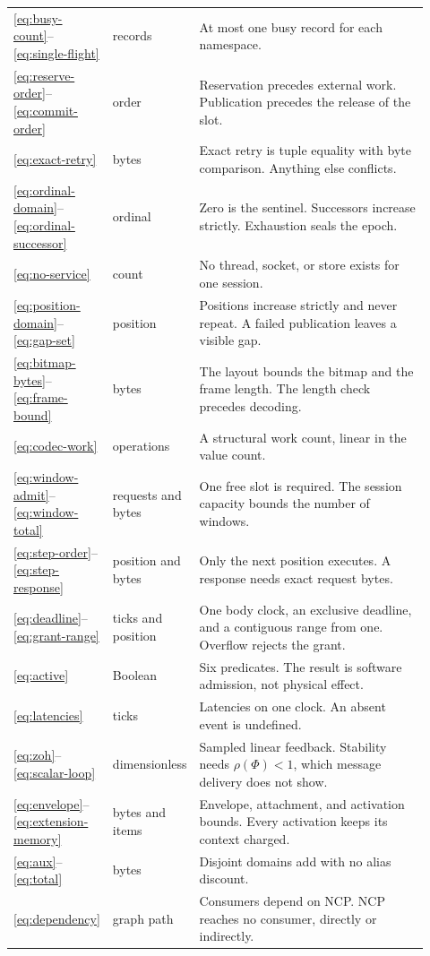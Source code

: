 \documentclass[11pt,a4paper]{article}
\theoremstyle{definition}
\begin{document}
\begin{longtable}{L{0.12\linewidth}L{0.17\linewidth}L{0.63\linewidth}}
\eqref{eq:busy-count}--\eqref{eq:single-flight} & records & At most one busy record for each namespace. \\
\eqref{eq:reserve-order}--\eqref{eq:commit-order} & order & Reservation precedes external work. Publication precedes the release of the slot. \\
\eqref{eq:exact-retry} & bytes & Exact retry is tuple equality with byte comparison. Anything else conflicts. \\
\eqref{eq:ordinal-domain}--\eqref{eq:ordinal-successor} & ordinal & Zero is the sentinel. Successors increase strictly. Exhaustion seals the epoch. \\
\eqref{eq:no-service} & count & No thread, socket, or store exists for one session. \\
\eqref{eq:position-domain}--\eqref{eq:gap-set} & position & Positions increase strictly and never repeat. A failed publication leaves a visible gap. \\
\eqref{eq:bitmap-bytes}--\eqref{eq:frame-bound} & bytes & The layout bounds the bitmap and the frame length. The length check precedes decoding. \\
\eqref{eq:codec-work} & operations & A structural work count, linear in the value count. \\
\eqref{eq:window-admit}--\eqref{eq:window-total} & requests and bytes & One free slot is required. The session capacity bounds the number of windows. \\
\eqref{eq:step-order}--\eqref{eq:step-response} & position and bytes & Only the next position executes. A response needs exact request bytes. \\
\eqref{eq:deadline}--\eqref{eq:grant-range} & ticks and position & One body clock, an exclusive deadline, and a contiguous range from one. Overflow rejects the grant. \\
\eqref{eq:active} & Boolean & Six predicates. The result is software admission, not physical effect. \\
\eqref{eq:latencies} & ticks & Latencies on one clock. An absent event is undefined. \\
\eqref{eq:zoh}--\eqref{eq:scalar-loop} & dimensionless & Sampled linear feedback. Stability needs $\rho(\Phi)<1$, which message delivery does not show. \\
\eqref{eq:envelope}--\eqref{eq:extension-memory} & bytes and items & Envelope, attachment, and activation bounds. Every activation keeps its context charged. \\
\eqref{eq:aux}--\eqref{eq:total} & bytes & Disjoint domains add with no alias discount. \\
\eqref{eq:dependency} & graph path & Consumers depend on NCP. NCP reaches no consumer, directly or indirectly. \\
\end{longtable}
\end{document}
